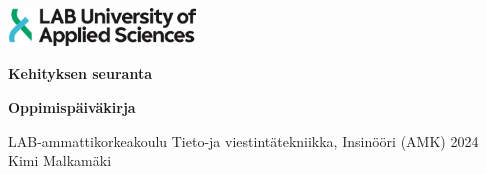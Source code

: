 \documentclass[11pt,a4paper,titlepage,oneside]{article}
\renewcommand{\baselinestretch}{1.5}
\begin{document}
\pagestyle{empty}



\includegraphics[width=5cm,height=1cm]{./src/labimg.jpg}

\renewcommand{\baselinestretch}{1} 
\setlength{\parskip}{0cm}

\vspace{86mm}
{\huge
\textbf{Kehityksen seuranta}
}
\newline

{\large

\vspace{5mm}
\textbf{Oppimispäiväkirja}
}

\vspace{90mm}

LAB-ammattikorkeakoulu \newline
\vspace{2mm}
Tieto-ja viestintätekniikka, Insinööri (AMK) \newline
\vspace{2mm}
2024 \newline
\vspace{2mm}
Kimi Malkamäki

\newpage






\begin{spacing}{1} %
    \setlength{\parskip}{0.5cm} 
    
\end{spacing}



\newpage




\setcounter{page}{0}
\pagestyle{empty}

\tableofcontents





\newpage



\end{document}
